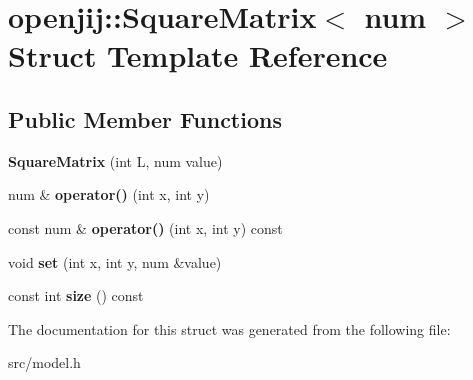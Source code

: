 \hypertarget{structopenjij_1_1_square_matrix}{}\section{openjij\+::Square\+Matrix$<$ num $>$ Struct Template Reference}
\label{structopenjij_1_1_square_matrix}
\subsection*{Public Member Functions}
\begin{DoxyCompactItemize}
\item 
\mbox{\label{structopenjij_1_1_square_matrix_a5f67d2b302f98893ac4d868099b678d8}} 
{\bfseries Square\+Matrix} (int L, num value)
\item 
\mbox{\label{structopenjij_1_1_square_matrix_a3ef4824cd91dceb992e5df2a0334160e}} 
num \& {\bfseries operator()} (int x, int y)
\item 
\mbox{\label{structopenjij_1_1_square_matrix_a60aad540dcca8af670d399e2b51c83a7}} 
const num \& {\bfseries operator()} (int x, int y) const
\item 
\mbox{\label{structopenjij_1_1_square_matrix_a63b9dff2df930c20fcabacc780eb9c58}} 
void {\bfseries set} (int x, int y, num \&value)
\item 
\mbox{\label{structopenjij_1_1_square_matrix_a74e315b28ef3676e671c3308c42082bb}} 
const int {\bfseries size} () const
\end{DoxyCompactItemize}


The documentation for this struct was generated from the following file\+:\begin{DoxyCompactItemize}
\item 
src/model.\+h\end{DoxyCompactItemize}
